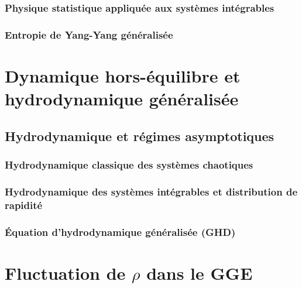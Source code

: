 \subsection{Physique statistique appliquée aux systèmes intégrables}

\subsection{Entropie de Yang-Yang généralisée}



\chapter{Dynamique hors-équilibre et hydrodynamique généralisée}
\minitoc
\section{Hydrodynamique et régimes asymptotiques}

\subsection{Hydrodynamique classique des systèmes chaotiques}
\subsection{Hydrodynamique des systèmes intégrables et distribution de rapidité}
\subsection{Équation d’hydrodynamique généralisée (GHD)}

\chapter{Fluctuation de $\rho$ dans le GGE } 



